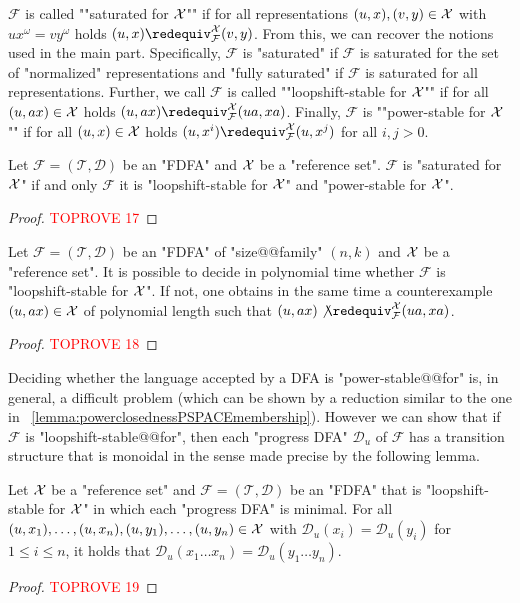 \documentclass[a4paper,USenglish,cleveref,autoref,thm-restate]{lipics-v2021}
\newcommand{\mc}[1]{\ensuremath{\mathcal{#1}}}
\newcommand{\T}{\mc{T}}
\newcommand{\F}{\mc{F}}
\newcommand{\D}{\mc{D}}
\begin{document}
{\AP
$\F$ is called ""saturated for $\mathcal{X}$"" if for all representations $(u,x),(v,y) \in \mathcal{X}$ with $ux^\omega = vy^\omega$ holds $(u,x) \redequiv^\X_\F (v,y)$.
From this, we can recover the notions used in the main part.
Specifically, $\F$ is "saturated" if $\F$ is saturated for the set of "normalized" representations and "fully saturated" if $\F$ is saturated for all representations.
\AP
Further, we call $\F$ is called ""loopshift-stable for $\mathcal{X}$"" if for all $(u,ax) \in \mathcal{X}$ holds $(u, ax) \redequiv^\X_\F (ua, xa)$.
Finally, $\F$ is ""power-stable for $\mathcal{X}$"" if for all $(u,x) \in \mathcal{X}$ holds $(u,x^i) \redequiv^\X_\F (u,x^j)$ for all $i, j > 0$.

\begin{lemma}
  Let $\F = (\T, \D)$ be an "FDFA" and $\mathcal{X}$ be a "reference set".
  $\F$ is "saturated for $\mathcal{X}$" if and only $\F$ it is
  "loopshift-stable for $\mathcal{X}$" and "power-stable for $\mathcal{X}$".\label{app:lemma:fdfacharacterisation}
\end{lemma}
\begin{proof}\textcolor{red}{TOPROVE 17}\end{proof}

\begin{lemma}
    Let $\F = (\T, \D)$ be an "FDFA" of "size@@family" $(n,k)$ and $\mathcal{X}$ be a "reference set".
    It is possible to decide in polynomial time whether $\F$ is "loopshift-stable for $\mathcal{X}$".
    If not, one obtains in the same time a counterexample $(u,ax) \in \mathcal{X}$ of polynomial length such that $(u, ax) \not\redequiv^\X_\F (ua,xa)$.\label{app:lemma:rotationinvariancedecidable}
\end{lemma}
\begin{proof}\textcolor{red}{TOPROVE 18}\end{proof}

Deciding whether the language accepted by a DFA is "power-stable@@for" is, in general, a difficult problem (which can be shown by a reduction similar to the one in ~\cref{lemma:powerclosednessPSPACEmembership}).
However we can show that if $\F$ is "loopshift-stable@@for", then each "progress DFA" $\D_u$ of $\F$ has a transition structure that is monoidal in the sense made precise by the following lemma.

\begin{lemma}
  Let $\mathcal{X}$ be a "reference set" and $\F = (\T, \D)$ be an "FDFA" that is "loopshift-stable for $\mathcal{X}$" in which each "progress DFA" is minimal.
  For all $(u,x_1), \dots, (u,x_n), (u,y_1),\dots,(u,y_n) \in \mathcal{X}$ with $\D_u(x_i) = \D_u(y_i)$ for $1 \leq i \leq n$, it holds that $\D_u(x_1 \dotsc x_n) = \D_u(y_1 \dotsc y_n)$.\label{app:lemma:rotationinvarianceproperty}
\end{lemma}
\begin{proof}\textcolor{red}{TOPROVE 19}\end{proof}

}
\end{document}
